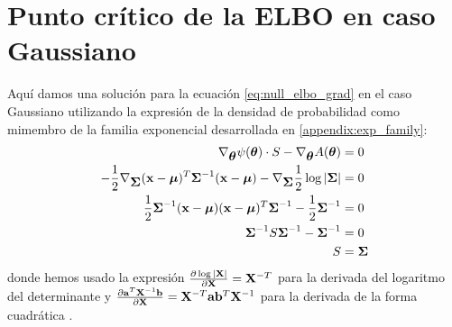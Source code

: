 \section{Punto crítico de la ELBO en caso Gaussiano}\label{appendix:null_grad_elbo}

Aquí damos una solución para la ecuación \ref{eq:null_elbo_grad} en el caso Gaussiano utilizando la expresión de la densidad de probabilidad como mimembro de la familia exponencial desarrollada en \ref{appendix:exp_family}:
\begin{align*}
    \nabla_{\mbox{\boldmath$ \theta $}} \psi(\mbox{\boldmath$ \theta $}) \cdot S - \nabla_{\mbox{\boldmath$ \theta $}} A(\mbox{\boldmath$ \theta $}) &= 0 \\
    -\frac{1}{2} \nabla_{\mbox{\boldmath$ \Sigma $}}  (\mathbf{x}- \mbox{\boldmath$ \mu $})^T \mbox{\boldmath$ \Sigma $}^{-1}(\mathbf{x}-\mbox{\boldmath$ \mu $}) - \nabla_{\mbox{\boldmath$ \Sigma $}} \frac{1}{2} \log |\mbox{\boldmath$ \Sigma $}| &= 0 \\
    \frac{1}{2} \mbox{\boldmath$ \Sigma $}^{-1} (\mathbf{x}- \mbox{\boldmath$ \mu $})(\mathbf{x}-\mbox{\boldmath$ \mu $})^T \mbox{\boldmath$ \Sigma $}^{-1} - \frac{1}{2} \mbox{\boldmath$ \Sigma $}^{-1} &= 0 \\
    \mbox{\boldmath$ \Sigma $}^{-1} S \mbox{\boldmath$ \Sigma $}^{-1} - \mbox{\boldmath$ \Sigma $}^{-1} &= 0 \\
    S &= \mbox{\boldmath$ \Sigma $} 
\end{align*}
donde hemos usado la expresión $\frac{\partial \log|\mathbf{X}|}{\partial \mathbf{X}} = \mathbf{X}^{-T}$ para la derivada del logaritmo del determinante y $\frac{\partial \mathbf{a}^T \mathbf{X}^{-1} \mathbf{b} }{\partial \mathbf{X}} = \mathbf{X}^{-T} \mathbf{a} \mathbf{b}^T \mathbf{X}^{-1}$ para la derivada de la forma cuadrática \cite{Petersen2012}.